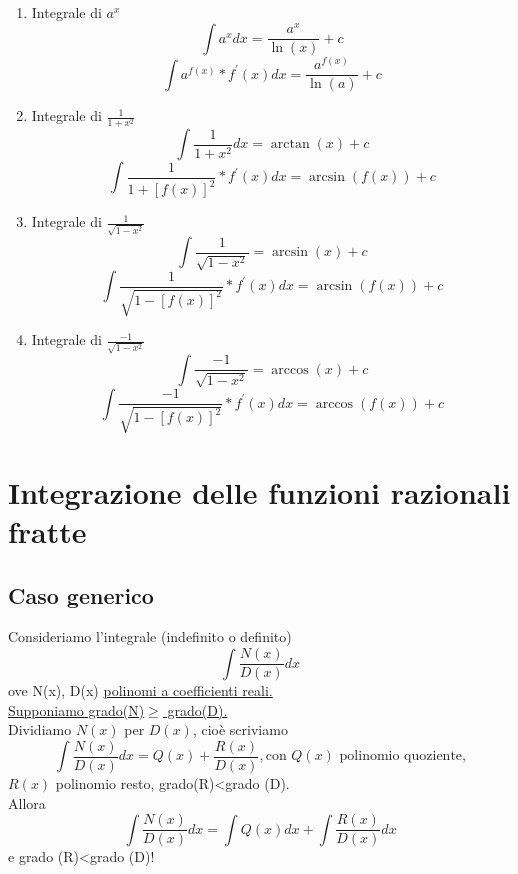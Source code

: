 \documentclass{article}
\begin{document}
\begin{enumerate}
\item Integrale di $a^x$
\begin{equation*}
	\int a^x dx=\frac{a^x}{\ln(x)}+c
\end{equation*}
\begin{equation*}
	\int a^{f(x)}*f^\prime (x) dx=\frac{a^{f(x)}}{\ln(a)}+c
\end{equation*}
\item Integrale di $\frac{1}{1+x^2}$
\begin{equation*}
	\int \frac{1}{1+x^2}dx=\arctan(x)+c
\end{equation*}
\begin{equation*}
	\int \frac{1}{1+[f(x)]^2}*f^\prime(x)dx=\arcsin(f(x))+c
\end{equation*}
\item Integrale di $\frac{1}{\sqrt{1-x^2}}$
\begin{equation*}
	\int\frac{1}{\sqrt{1-x^2}}=\arcsin(x)+c
\end{equation*}
\begin{equation*}
	\int\frac{1}{\sqrt{1-[f(x)]^2}}*f^\prime(x)dx=\arcsin(f(x))+c
\end{equation*}
\item Integrale di $\frac{-1}{\sqrt{1-x^2}}$
\begin{equation*}
	\int\frac{-1}{\sqrt{1-x^2}}=\arccos(x)+c
\end{equation*}
\begin{equation*}
	\int\frac{-1}{\sqrt{1-[f(x)]^2}}*f^\prime(x)dx=\arccos(f(x))+c
\end{equation*}
\end{enumerate}
\section{Integrazione delle funzioni razionali fratte}
\subsection{Caso generico}
Consideriamo l'integrale (indefinito o definito)
\begin{equation*}
	\int\frac{N(x)}{D(x)}dx
\end{equation*}
ove N(x), D(x) \underline{polinomi a coefficienti reali.}\\
\underline{Supponiamo grado(N)$\geq$ grado(D).}\\
Dividiamo $N(x)$ per $D(x)$, cioè scriviamo
\begin{equation*}
	\int\frac{N(x)}{D(x)}dx=Q(x)+\frac{R(x)}{D(x)}, \text{con $Q(x)$ polinomio quoziente,}
\end{equation*}
$R(x)$ polinomio resto, grado(R)<grado (D).\\
Allora
\begin{equation*}
\int \frac{N(x)}{D(x)}dx=\int Q(x)dx+\int \frac{R(x)}{D(x)}dx
\end{equation*}
e grado (R)<grado (D)!
\end{document}
